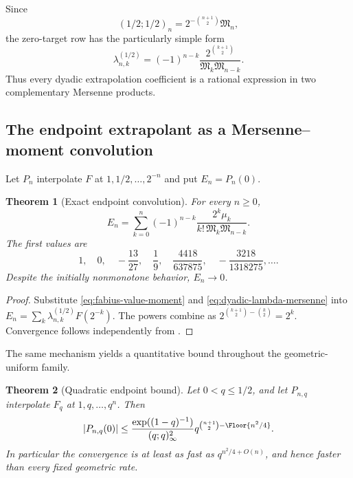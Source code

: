 \documentclass[11pt,a4paper,oneside]{article}
\newtheorem{theorem}{Theorem}[section]
\theoremstyle{definition}
\theoremstyle{remark}
\begin{document}
Since
\begin{equation}
 (1/2;1/2)_n=2^{-\binom{n+1}{2}}\mathfrak M_n,
 \label{eq:qpoch-mersenne}
\end{equation}
the zero-target row has the particularly simple form
\begin{equation}
 \lambda_{n,k}^{(1/2)}
 =(-1)^{n-k}
 \frac{2^{\binom{k+1}{2}}}
 {\mathfrak M_k\mathfrak M_{n-k}}.
 \label{eq:dyadic-lambda-mersenne}
\end{equation}
Thus every dyadic extrapolation coefficient is a rational expression in two
complementary Mersenne products.

\subsection{The endpoint extrapolant as a Mersenne--moment convolution}

Let $P_n$ interpolate $F$ at
$1,1/2,\ldots,2^{-n}$ and put $E_n=P_n(0)$.

\begin{theorem}[Exact endpoint convolution]
\label{thm:fabius-endpoint-convolution}
For every $n\ge0$,
\begin{equation}
 E_n
 =\sum_{k=0}^n(-1)^{n-k}
 \frac{2^k\mu_k}
 {k!\,\mathfrak M_k\mathfrak M_{n-k}}.
 \label{eq:fabius-endpoint-convolution}
\end{equation}
The first values are
\[
 1,\quad 0,\quad -\frac{13}{27},\quad \frac19,\quad
 \frac{4418}{637875},\quad -\frac{3218}{1318275},\ldots.
\]
Despite the initially nonmonotone behavior, $E_n\to0$.
\end{theorem}

\begin{proof}
Substitute \eqref{eq:fabius-value-moment} and
\eqref{eq:dyadic-lambda-mersenne} into
$E_n=\sum_k\lambda_{n,k}^{(1/2)}F(2^{-k})$.  The powers combine as
$2^{\binom{k+1}{2}-\binom k2}=2^k$.  Convergence follows independently from
.
\end{proof}

The same mechanism yields a quantitative bound throughout the
geometric-uniform family.

\begin{theorem}[Quadratic endpoint bound]
\label{thm:quadratic-endpoint-bound}
Let $0<q\le1/2$, and let $P_{n,q}$ interpolate $F_q$ at
$1,q,\ldots,q^n$.  Then
\begin{equation}
 |P_{n,q}(0)|
 \le
 \frac{\exp((1-q)^{-1})}{(q;q)_\infty^2}
 q^{\binom{n+1}{2}-\Floor{n^2/4}}.
 \label{eq:quadratic-endpoint-bound}
\end{equation}
In particular the convergence is at least as fast as
$q^{n^2/4+O(n)}$, and hence faster than every fixed geometric rate.
\end{theorem}
\end{document}

